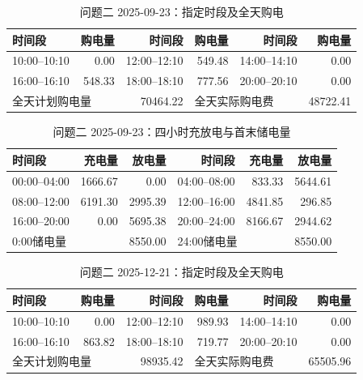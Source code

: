 \FloatBarrier
\begin{table}[htbp]\centering\scriptsize
\caption{问题二 2025-09-23：指定时段及全天购电}
\begin{tabular}{lrrrrr}\toprule
时间段 & 购电量 & 时间段 & 购电量 & 时间段 & 购电量\\\midrule
10:00--10:10 & 0.00 & 12:00--12:10 & 549.48 & 14:00--14:10 & 0.00\\
16:00--16:10 & 548.33 & 18:00--18:10 & 777.56 & 20:00--20:10 & 0.00\\
\multicolumn{2}{l}{全天计划购电量} & 70464.22 & \multicolumn{2}{l}{全天实际购电费} & 48722.41\\
\bottomrule\end{tabular}\end{table}

\begin{table}[htbp]\centering\scriptsize
\caption{问题二 2025-09-23：四小时充放电与首末储电量}
\begin{tabular}{lrrrrr}\toprule
时间段 & 充电量 & 放电量 & 时间段 & 充电量 & 放电量\\\midrule
00:00--04:00 & 1666.67 & 0.00 & 04:00--08:00 & 833.33 & 5644.61\\
08:00--12:00 & 6191.30 & 2995.39 & 12:00--16:00 & 4841.85 & 296.85\\
16:00--20:00 & 0.00 & 5695.38 & 20:00--24:00 & 8166.67 & 2944.62\\
\multicolumn{2}{l}{0:00储电量} & 8550.00 & \multicolumn{2}{l}{24:00储电量} & 8550.00\\
\bottomrule\end{tabular}\end{table}

\FloatBarrier
\begin{table}[htbp]\centering\scriptsize
\caption{问题二 2025-12-21：指定时段及全天购电}
\begin{tabular}{lrrrrr}\toprule
时间段 & 购电量 & 时间段 & 购电量 & 时间段 & 购电量\\\midrule
10:00--10:10 & 0.00 & 12:00--12:10 & 989.93 & 14:00--14:10 & 0.00\\
16:00--16:10 & 863.82 & 18:00--18:10 & 719.77 & 20:00--20:10 & 0.00\\
\multicolumn{2}{l}{全天计划购电量} & 98935.42 & \multicolumn{2}{l}{全天实际购电费} & 65505.96\\
\bottomrule\end{tabular}\end{table}

